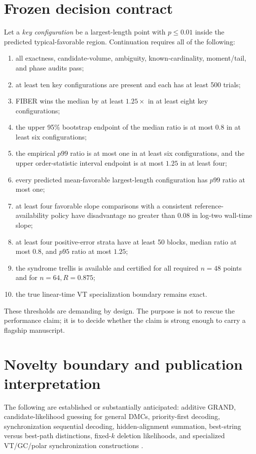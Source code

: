 \documentclass[11pt]{article}
\theoremstyle{definition}
\theoremstyle{remark}
\begin{document}
\section{Frozen decision contract}
Let a \emph{key configuration} be a largest-length point with $p\le0.01$ inside the predicted typical-favorable region.  Continuation requires all of the following:
\begin{enumerate}[label=G\arabic*.,leftmargin=2.5em]
\item all exactness, candidate-volume, ambiguity, known-cardinality, moment/tail, and phase audits pass;
\item at least ten key configurations are present and each has at least 500 trials;
\item FIBER wins the median by at least $1.25\times$ in at least eight key configurations;
\item the upper 95\% bootstrap endpoint of the median ratio is at most $0.8$ in at least six configurations;
\item the empirical $p99$ ratio is at most one in at least six configurations, and the upper order-statistic interval endpoint is at most $1.25$ in at least four;
\item every predicted mean-favorable largest-length configuration has $p99$ ratio at most one;
\item at least four favorable slope comparisons with a consistent reference-availability policy have disadvantage no greater than $0.08$ in log-two wall-time slope;
\item at least four positive-error strata have at least 50 blocks, median ratio at most $0.8$, and $p95$ ratio at most $1.25$;
\item the syndrome trellis is available and certified for all required $n=48$ points and for $n=64,R=0.875$;
\item the true linear-time VT specialization boundary remains exact.
\end{enumerate}

These thresholds are demanding by design.  The purpose is not to rescue the performance claim; it is to decide whether the claim is strong enough to carry a flagship manuscript.

\section{Novelty boundary and publication interpretation}
The following are established or substantially anticipated: additive GRAND, candidate-likelihood guessing for general DMCs, priority-first decoding, synchronization sequential decoding, hidden-alignment summation, best-string versus best-path distinctions, fixed-$k$ deletion likelihoods, and specialized VT/GC/polar synchronization constructions \cite{Duffy2019,TanJoudeh2025,Han1993,Gallager1961,DaveyMacKay2001,Sabary2022}.
\end{document}
